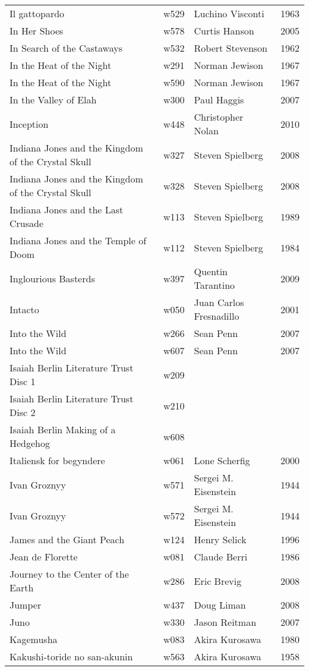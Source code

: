 \documentclass{article}
\begin{document}
\begin {center}
\begin{longtable}{p{10cm} l l l}
Il gattopardo & w529 & Luchino Visconti & 1963 \\
In Her Shoes & w578 & Curtis Hanson & 2005 \\
In Search of the Castaways & w532 & Robert Stevenson & 1962 \\
In the Heat of the Night & w291 & Norman Jewison & 1967 \\
In the Heat of the Night & w590 & Norman Jewison & 1967 \\
In the Valley of Elah & w300 & Paul Haggis & 2007 \\
Inception & w448 & Christopher Nolan & 2010 \\
Indiana Jones and the Kingdom of the Crystal Skull & w327 & Steven Spielberg & 2008 \\
Indiana Jones and the Kingdom of the Crystal Skull & w328 & Steven Spielberg & 2008 \\
Indiana Jones and the Last Crusade & w113 & Steven Spielberg & 1989 \\
Indiana Jones and the Temple of Doom & w112 & Steven Spielberg & 1984 \\
Inglourious Basterds & w397 & Quentin Tarantino & 2009 \\
Intacto & w050 & Juan Carlos Fresnadillo & 2001 \\
Into the Wild & w266 & Sean Penn & 2007 \\
Into the Wild & w607 & Sean Penn & 2007 \\
Isaiah Berlin Literature Trust Disc 1 & w209 &  &  \\
Isaiah Berlin Literature Trust Disc 2 & w210 &  &  \\
Isaiah Berlin Making of a Hedgehog & w608 &  &  \\
Italiensk for begyndere & w061 & Lone Scherfig & 2000 \\
Ivan Groznyy & w571 & Sergei M. Eisenstein & 1944 \\
Ivan Groznyy & w572 & Sergei M. Eisenstein & 1944 \\
James and the Giant Peach & w124 & Henry Selick & 1996 \\
Jean de Florette & w081 & Claude Berri & 1986 \\
Journey to the Center of the Earth & w286 & Eric Brevig & 2008 \\
Jumper & w437 & Doug Liman & 2008 \\
Juno & w330 & Jason Reitman & 2007 \\
Kagemusha & w083 & Akira Kurosawa & 1980 \\
Kakushi-toride no san-akunin & w563 & Akira Kurosawa & 1958 \\

\end{longtable}
\end{center}
\end{document}
